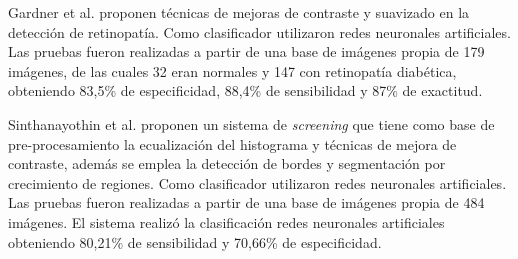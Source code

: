 Gardner et al. \cite{gardner1996automatic} proponen técnicas de mejoras de contraste y suavizado en la detección de retinopatía. Como clasificador utilizaron redes neuronales artificiales. Las pruebas fueron realizadas a partir de una base de imágenes propia de 179 imágenes, de las cuales 32 eran normales y 147 con retinopatía diabética, obteniendo 83,5\% de especificidad, 88,4\%  de sensibilidad y 87\% de exactitud.

   





Sinthanayothin et al. \cite{sinthanayothin2003automated} proponen un sistema de \textit{screening} que tiene como base de pre-procesamiento la ecualización del histograma y técnicas de mejora de contraste, además se emplea la detección de bordes y segmentación por crecimiento de regiones. Como clasificador utilizaron redes neuronales artificiales.  Las pruebas fueron realizadas a partir de una base de imágenes propia de 484 imágenes. El sistema realizó la clasificación  redes neuronales artificiales obteniendo 80,21\% de sensibilidad y 70,66\% de especificidad.  



